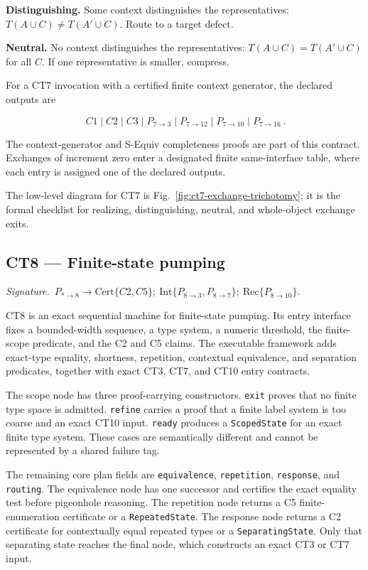 \documentclass[
  11pt,
]{article}
\theoremstyle{definition}
\newcommand{\ctsignature}[1]{\par\noindent\emph{Signature.}\ #1\par\medskip}
\newcommand{\ctcert}[1]{\mathrm{Cert}\{#1\}}
\newcommand{\ctint}[1]{\mathrm{Int}\{#1\}}
\newcommand{\ctrec}[1]{\mathrm{Rec}\{#1\}}
\begin{document}
\textbf{Distinguishing.} Some context distinguishes the representatives:
$T(A\cup C)\ne T(A'\cup C)$. Route to a target defect.

\textbf{Neutral.} No context distinguishes the representatives:
$T(A\cup C)=T(A'\cup C)$ for all $C$. If one representative is
smaller, compress.

For a CT7 invocation with a certified finite context generator, the
declared outputs are

\[
\boxed{\ C1\mid C2\mid C3\mid
P_{7\to3}\mid P_{7\to12}\mid P_{7\to10}\mid P_{7\to16}\ }.
\]

The context-generator and S-Equiv completeness proofs are part of this
contract. Exchanges of increment zero enter a designated finite
same-interface table, where each entry is assigned one of the declared
outputs.

The low-level diagram for CT7 is Fig.~\ref{fig:ct7-exchange-trichotomy};
it is the formal checklist for realizing, distinguishing, neutral, and
whole-object exchange exits.



\subsection{CT8 --- Finite-state pumping}\label{ct:8}\label{the-finite-state-pumping-principle}
\ctsignature{\(P_{\ast\to8}\to \ctcert{C2,C5};\ \ctint{P_{8\to3},P_{8\to7}};\ \ctrec{P_{8\to10}}\).}

CT8 is an exact sequential machine for finite-state pumping.  Its entry
interface fixes a bounded-width sequence, a type system, a numeric threshold,
the finite-scope predicate, and the C2 and C5 claims.  The executable framework
adds exact-type equality, shortness, repetition, contextual equivalence, and
separation predicates, together with exact CT3, CT7, and CT10 entry contracts.

The scope node has three proof-carrying constructors.  \texttt{exit} proves
that no finite type space is admitted.  \texttt{refine} carries a proof that a
finite label system is too coarse and an exact CT10 input.  \texttt{ready}
produces a \texttt{ScopedState} for an exact finite type system.  These cases
are semantically different and cannot be represented by a shared failure tag.

The remaining core plan fields are \texttt{equivalence},
\texttt{repetition}, \texttt{response}, and \texttt{routing}.  The
equivalence node has one successor and certifies the exact equality test before
pigeonhole reasoning.  The repetition node returns a C5 finite-enumeration
certificate or a \texttt{RepeatedState}.  The response node returns a C2
certificate for contextually equal repeated types or a
\texttt{SeparatingState}.  Only that separating state reaches the final node,
which constructs an exact CT3 or CT7 input.
\end{document}
